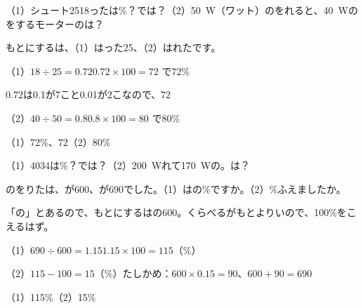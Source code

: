 \begin{reidai}
（1）シュート2518ったは\%？では？（2）\qty{50}{W}（ワット）のをれると、\qty{40}{W}のをするモーターのは？\par
\kangaekata もとにするは、（1）はった25、（2）はれたです。\par
\shiki（1）$18\div25=0.72$\quad $0.72\times100=72$ で72\%\par
\hspace*{2.6\zw}\phantom{（1）}0.72は0.1が7こと0.01が2こなので、72\par
\hspace*{2.6\zw}（2）$40\div50=0.8$\quad $0.8\times100=80$ で80\%\par
\kotae（1）72\%、72\quad（2）80\%
\end{reidai}

\begin{jibun}
（1）4034は\%？では？（2）\qty{200}{W}れて\qty{170}{W}の。は？
\end{jibun}

\begin{reidai}[100\%をこえる\R{割合}{わり|あい}]
のをりたは、が600、が690でした。（1）はの\%ですか。（2）\%ふえましたか。\par
\kangaekata 「の」とあるので、もとにするはの600。くらべるがもとよりいので、100\%をこえるはず。\par
\shiki（1）$690\div600=1.15$\quad $1.15\times100=115$（\%）\par
\hspace*{2.6\zw}（2）$115-100=15$（\%）\quad たしかめ：$600\times0.15=90$、$600+90=690$\par
\kotae（1）115\%\quad（2）15\%
\end{reidai}


